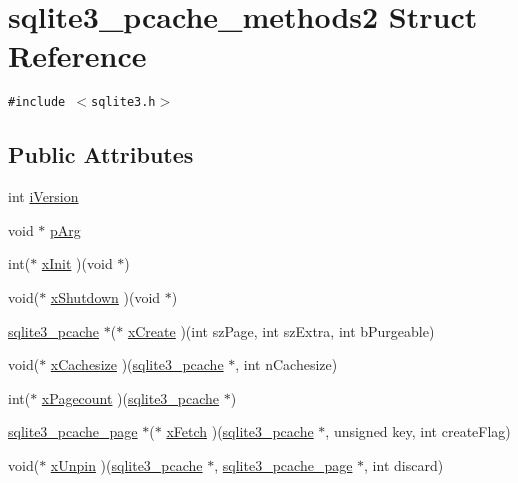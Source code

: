 \hypertarget{structsqlite3__pcache__methods2}{
\section{sqlite3\_\-pcache\_\-methods2 Struct Reference}
\label{structsqlite3__pcache__methods2}
}
{\tt \#include $<$sqlite3.h$>$}

\subsection*{Public Attributes}
\begin{CompactItemize}
\item 
int \hyperlink{structsqlite3__pcache__methods2_03b27be6c7cb8f1d2662c454cbe58483}{iVersion}
\item 
void $\ast$ \hyperlink{structsqlite3__pcache__methods2_ee83131f16bb88218d7b0339854719d6}{pArg}
\item 
int($\ast$ \hyperlink{structsqlite3__pcache__methods2_8f77114458576c9d75cd53822fcd3462}{xInit} )(void $\ast$)
\item 
void($\ast$ \hyperlink{structsqlite3__pcache__methods2_00a780e295b89976940cd3cba2cfeaee}{xShutdown} )(void $\ast$)
\item 
\hyperlink{sqlite3_8h_096c453d937d51f7926d7d31c8e0bd2f}{sqlite3\_\-pcache} $\ast$($\ast$ \hyperlink{structsqlite3__pcache__methods2_6a31fcb6e57868bd44d542ef11d55d03}{xCreate} )(int szPage, int szExtra, int bPurgeable)
\item 
void($\ast$ \hyperlink{structsqlite3__pcache__methods2_4889ab0903938f485aa0fa4fc6925d26}{xCachesize} )(\hyperlink{sqlite3_8h_096c453d937d51f7926d7d31c8e0bd2f}{sqlite3\_\-pcache} $\ast$, int nCachesize)
\item 
int($\ast$ \hyperlink{structsqlite3__pcache__methods2_5d51aba3927db1da9acf31fbdf7d57b5}{xPagecount} )(\hyperlink{sqlite3_8h_096c453d937d51f7926d7d31c8e0bd2f}{sqlite3\_\-pcache} $\ast$)
\item 
\hyperlink{structsqlite3__pcache__page}{sqlite3\_\-pcache\_\-page} $\ast$($\ast$ \hyperlink{structsqlite3__pcache__methods2_d534a6947b55fd42fde011dab490cd0f}{xFetch} )(\hyperlink{sqlite3_8h_096c453d937d51f7926d7d31c8e0bd2f}{sqlite3\_\-pcache} $\ast$, unsigned key, int createFlag)
\item 
void($\ast$ \hyperlink{structsqlite3__pcache__methods2_c94294551eda282f17b1ed2a110e1850}{xUnpin} )(\hyperlink{sqlite3_8h_096c453d937d51f7926d7d31c8e0bd2f}{sqlite3\_\-pcache} $\ast$, \hyperlink{structsqlite3__pcache__page}{sqlite3\_\-pcache\_\-page} $\ast$, int discard)

\end{CompactItemize}
